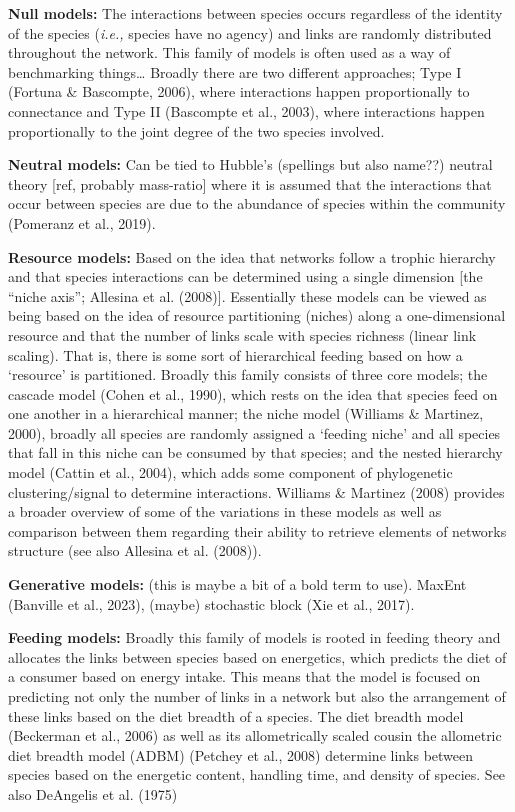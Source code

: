 \documentclass[
]{article}
\begin{document}
\textbf{Null models:} The interactions between species occurs regardless
of the identity of the species (\emph{i.e.,} species have no agency) and
links are randomly distributed throughout the network. This family of
models is often used as a way of benchmarking things\ldots{} Broadly
there are two different approaches; Type I (Fortuna \& Bascompte, 2006),
where interactions happen proportionally to connectance and Type II
(Bascompte et al., 2003), where interactions happen proportionally to
the joint degree of the two species involved.

\textbf{Neutral models:} Can be tied to Hubble's (spellings but also
name??) neutral theory {[}ref, probably mass-ratio{]} where it is
assumed that the interactions that occur between species are due to the
abundance of species within the community (Pomeranz et al., 2019).

\textbf{Resource models:} Based on the idea that networks follow a
trophic hierarchy and that species interactions can be determined using
a single dimension {[}the ``niche axis''; Allesina et al. (2008){]}.
Essentially these models can be viewed as being based on the idea of
resource partitioning (niches) along a one-dimensional resource and that
the number of links scale with species richness (linear link scaling).
That is, there is some sort of hierarchical feeding based on how a
`resource' is partitioned. Broadly this family consists of three core
models; the cascade model (Cohen et al., 1990), which rests on the idea
that species feed on one another in a hierarchical manner; the niche
model (Williams \& Martinez, 2000), broadly all species are randomly
assigned a `feeding niche' and all species that fall in this niche can
be consumed by that species; and the nested hierarchy model (Cattin et
al., 2004), which adds some component of phylogenetic clustering/signal
to determine interactions. Williams \& Martinez (2008) provides a
broader overview of some of the variations in these models as well as
comparison between them regarding their ability to retrieve elements of
networks structure (see also Allesina et al. (2008)).

\textbf{Generative models:} (this is maybe a bit of a bold term to use).
MaxEnt (Banville et al., 2023), (maybe) stochastic block (Xie et al.,
2017).

\textbf{Feeding models:} Broadly this family of models is rooted in
feeding theory and allocates the links between species based on
energetics, which predicts the diet of a consumer based on energy
intake. This means that the model is focused on predicting not only the
number of links in a network but also the arrangement of these links
based on the diet breadth of a species. The diet breadth model
(Beckerman et al., 2006) as well as its allometrically scaled cousin the
allometric diet breadth model (ADBM) (Petchey et al., 2008) determine
links between species based on the energetic content, handling time, and
density of species. See also DeAngelis et al. (1975)
\end{document}
